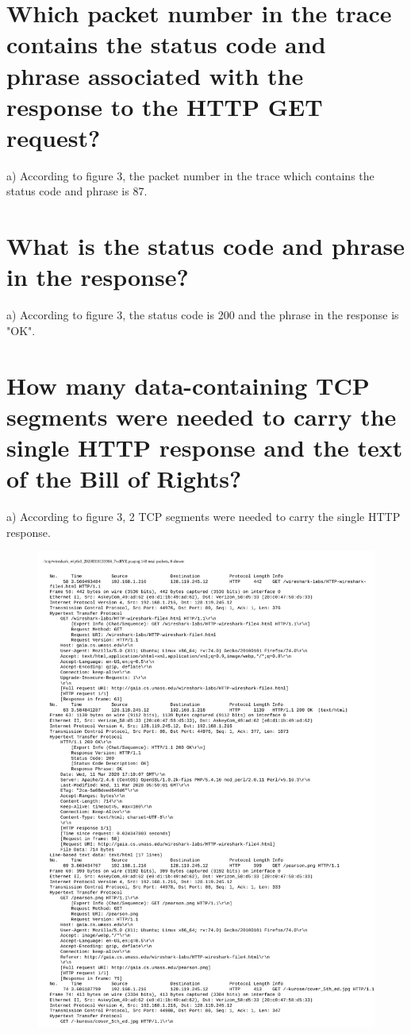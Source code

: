 \documentclass{article}
\begin{document}
\section{Which packet number in the trace contains the status code and phrase associated
with the response to the HTTP GET request?}
a)  According to figure 3, the packet number in the trace which contains the status code and phrase is 87.\\
\section{What is the status code and phrase in the response?}
a)  According to figure 3, the status code is 200 and the phrase in the response is "OK".\\
\section{How many data-containing TCP segments were needed to carry the single HTTP
response and the text of the Bill of Rights?}
a)  According to figure 3, 2 TCP segments were needed to carry the single HTTP response.\\
\begin{figure}[h!]
\centering
\includegraphics[scale=0.45]{Q16-17Output.pdf}
\caption{}
\end{figure}
\end{document}
